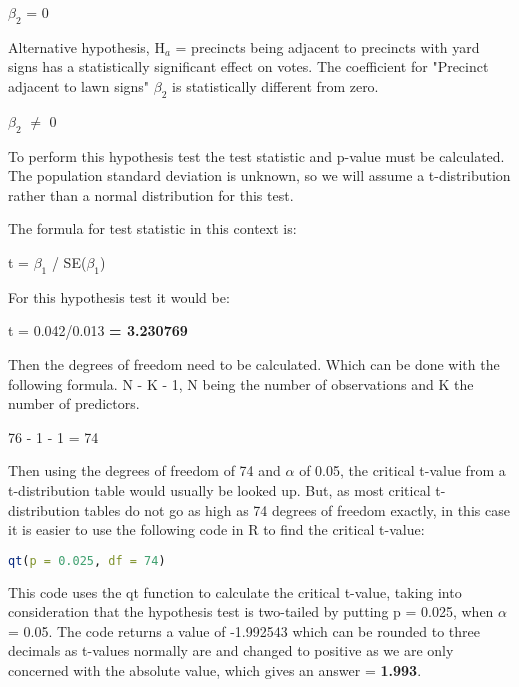 \documentclass[12pt,letterpaper]{article}
\begin{document}
\begin{enumerate}
	$\beta_2$ = 0
	
	Alternative hypothesis, H$_a$ = precincts being adjacent to precincts with yard signs has a statistically significant effect on votes. The coefficient for "Precinct adjacent to lawn signs" $\beta_2$ is statistically different from zero.
	
	$\beta_2$ $\neq$ 0
	\vspace{0.1cm}
	
	To perform this hypothesis test the test statistic and p-value must be calculated. The population standard deviation is unknown, so we will assume a t-distribution rather than a normal distribution for this test.
	
	\vspace{0.1cm}
	
	The formula for test statistic in this context is:
	
	\vspace{0.1cm}
	
	t = $\beta_1$ / SE($\beta_1$)
	
	\vspace{0.1cm}
	
	For this hypothesis test it would be:
	
	t = 0.042/0.013 \textbf{= 3.230769}
	
	\vspace{0.1cm}
	
	Then the degrees of freedom need to be calculated. Which can be done with the following formula. N - K - 1, N being the number of observations and K the number of predictors.
	
	\vspace{0.1cm}
	
	76 - 1 - 1 = 74
	
	\vspace{0.1cm}
	
	Then using the degrees of freedom of 74 and $\alpha$ of 0.05, the critical t-value from a t-distribution table would usually be looked up. But, as most critical t-distribution tables do not go as high as 74 degrees of freedom exactly, in this case it is easier to use the following code in R to find the critical t-value:
	
	\begin{lstlisting}[language=R]
	qt(p = 0.025, df = 74)
	\end{lstlisting}
	
	This code uses the qt function to calculate the critical t-value, taking into consideration that the hypothesis test is two-tailed by putting p = 0.025, when $\alpha$ = 0.05. The code returns a value of -1.992543 which can be rounded to three decimals as t-values normally are and changed to positive as we are only concerned with the absolute value, which gives an answer = \textbf{1.993}.
	

\end{enumerate}
\end{document}
